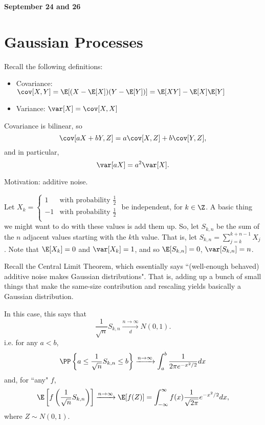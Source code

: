 
\newcommand{\style}{\displaystyle} %

\setlength{\parindent}{0pt} %



\textbf{\Large September 24 and 26}

\section{Gaussian Processes}

Recall the following definitions:
\begin{itemize}

\item Covariance: $\cov[X,Y]=\E[(X-\E[X])(Y-\E[Y])]=\E[XY]-\E[X]\E[Y]$

\item Variance: $\var[X]=\cov[X,X]$

\end{itemize}

Covariance is bilinear, so \[\cov[aX+bY,Z]=a\cov[X,Z]+b\cov[Y,Z],\] and in particular, \[\var[aX]=a^2\var[X].\]

Motivation: additive noise.

Let $X_k=\left\{\begin{array}{cc}
1 &\text{with probability }\frac{1}{2}\\
-1 & \text{with probability }\frac{1}{2}\\
\end{array}\right.$ be independent, for $k\in\Z$.  A basic thing we might want to do with these values is add them up.  So, let $S_{k,n}$ be the sum of the $n$ adjacent values starting with the $k$th value.  That is, let $S_{k,n}=\sum_{j=k}^{k+n-1}X_j$.  Note that $\E[X_k]=0$ and $\var[X_k]=1$, and so $\E[S_{k,n}]=0$, $\var[S_{k,n}]=n$.

Recall the Central Limit Theorem, which essentially says ``(well-enough behaved) additive noise makes Gaussian distributions".  That is, adding up a bunch of small things that make the same-size contribution and rescaling yields basically a Gaussian distribution.

In this case, this says that \[\frac{1}{\sqrt{n}}S_{k,n}\xrightarrow[d]{n\to\infty} N(0,1).\]  i.e. for any $a<b$, \[\PP\left\{a\leq\frac{1}{\sqrt{n}}S_{k,n}\leq b\right\}\xrightarrow{n\to\infty}\int_a^b \frac{1}{2\pi e^{-x^2/2}}dx\] and, for ``any" $f$, \begin{equation}
\E\left[f\left(\frac{1}{\sqrt{n}}S_{k,n}\right)\right]\xrightarrow{n\to\infty}\E[f(Z)]=\int_{-\infty}^\infty f(x)\frac{1}{\sqrt{2\pi}}e^{-x^2/2}dx,
\end{equation} where $Z\sim N(0,1)$.

